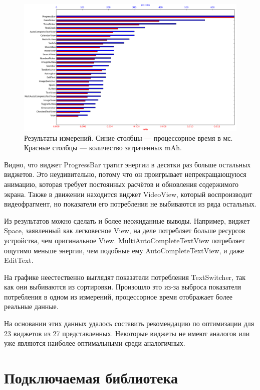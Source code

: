 \documentclass[a4paper,14pt]{extarticle} %
\begin{document}
	\begin{figure}[!htb]
		\includegraphics[width=\textwidth]{result_scaled}
		\caption{Результаты измерений. Синие столбцы --- процессорное время в мс. Красные столбцы --- количество затраченных mAh.}
		\label{fig:result_scaled}
	\end{figure}

	Видно, что виджет ProgressBar тратит энергии в десятки раз больше остальных виджетов. Это неудивительно, потому что он проигрывает непрекращающуюся анимацию, которая требует постоянных расчётов и обновления содержимого экрана. Также в движении находится виджет VideoView, который воспроизводит видеофрагмент, но показатели его потребления не выбиваются из ряда остальных.
	
	Из результатов можно сделать и более неожиданные выводы. Например, виджет Space, заявленный как легковесное View, на деле потребляет больше ресурсов устройства, чем оригинальное View. MultiAutoCompleteTextView потребляет ощутимо меньше энергии, чем подобные ему AutoCompleteTextView, и даже EditText.

	
	На графике неестественно выглядят показатели потребления TextSwitcher, так как они выбиваются из сортировки. Произошло это из-за выброса показателя потребления в одном из измерений, процессорное время отображает более реальные данные.
	
	На основании этих данных удалось составить рекомендацию по оптимизации для 23 виджетов из 27 представленных. Некоторые виджеты не имеют аналогов или уже являются наиболее оптимальными среди аналогичных.
	
	\clearpage
	\section{Подключаемая библиотека}
	
\end{document}
